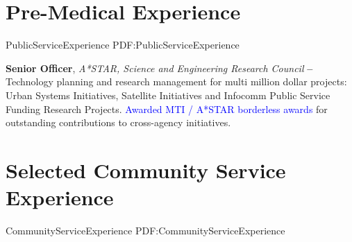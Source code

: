 \documentclass[letterpaper,10pt,oneside]{article}
\begin{document}
\begin{body}



\section
{Pre-Medical Experience}
{PublicServiceExperience}
{PDF:PublicServiceExperience}


{\textbf{Senior Officer}, \textit{A*STAR, Science and Engineering Research Council}}
\hfill
\textbf{
 --
}
\BulletItem
Technology planning and research management for multi million dollar projects: Urban Systems Initiatives, Satellite Initiatives and Infocomm Public Service Funding Research Projects. 
\BulletItem
\textcolor{blue}{Awarded MTI / A*STAR borderless awards} for outstanding contributions to cross-agency initiatives.

\section
{Selected Community Service Experience}
{CommunityServiceExperience}
{PDF:CommunityServiceExperience}



\end{body}
\end{document}
